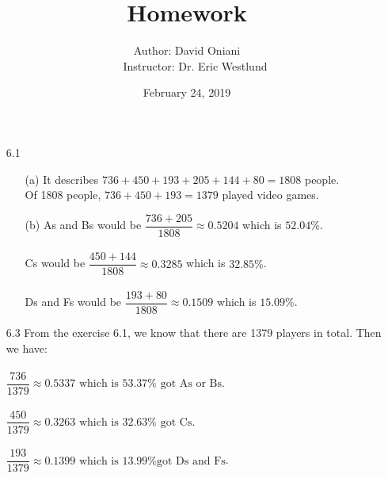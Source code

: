 \documentclass[11pt, a4paper]{article}
\title{\bf{Homework \textnumero 6}}
\author{Author: David Oniani
\\
\ \ \ Instructor: Dr. Eric Westlund}
\date{February 24, 2019}
\begin{document}
\maketitle

\begin{itemize}
\item[6.1]
\begin{itemize}
\item[(a)]
It describes $736 + 450 + 193 + 205 + 144 + 80 = 1808$ people.\\
Of 1808 people, $736 + 450 + 193 = 1379$ played video games.

\item[]

\item[(b)]
As and Bs would be $\dfrac{736 + 205}{1808} \approx 0.5204$ which is $52.04\%$.\\\\
Cs would be $\dfrac{450 + 144}{1808} \approx 0.3285$ which is $32.85\%$.\\\\
Ds and Fs would be $\dfrac{193 + 80}{1808} \approx 0.1509$ which is $15.09\%$.
\end{itemize}

\item[]
\item[]

\item[6.3]
From the exercise 6.1, we know that there are 1379 players in total.
Then we have:\\\\
$\dfrac{736}{1379} \approx 0.5337 \text{ which is } 53.37\% \text{ got As or Bs}.$\\\\
$\dfrac{450}{1379} \approx 0.3263 \text{ which is } 32.63\% \text{ got Cs}.$\\\\
$\dfrac{193}{1379} \approx 0.1399 \text{ which is } 13.99\% \text{got Ds and Fs}$.

\item[]
\item[]


\end{itemize}
\end{document}
